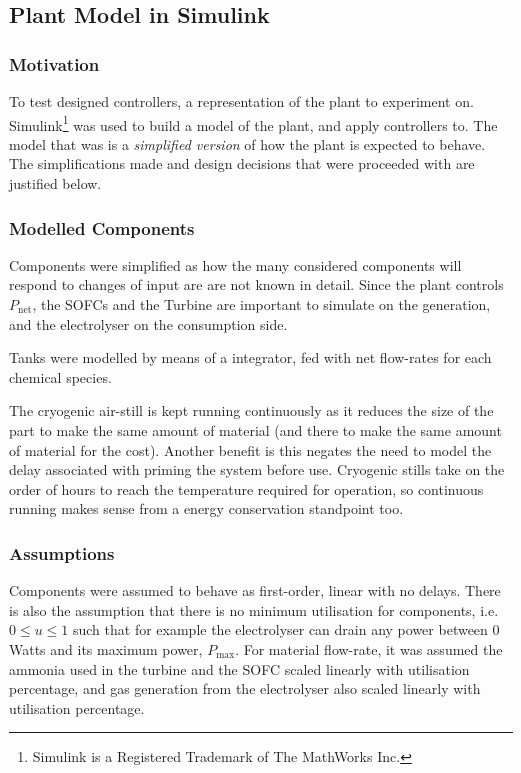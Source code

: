 \subsection{Plant Model in Simulink\textregistered}
\label{sec:plant}

\subsubsection{Motivation}
To test designed controllers, a representation of the plant to experiment on.
Simulink\footnote{Simulink is a Registered Trademark of The MathWorks Inc.} was used to build a model of the plant, and apply controllers to.
The model that was is a \emph{simplified version} of how the plant is expected to behave.
The simplifications made and design decisions that were proceeded with are justified below.

\subsubsection{Modelled Components}

Components were simplified as how the many considered components will respond to changes of input are are not known in detail.
Since the plant controls $P_{\text{net}}$, the SOFCs and the Turbine are important to simulate on the generation, and the electrolyser on the consumption side.

Tanks were modelled by means of a integrator, fed with net flow-rates for each chemical species.

The cryogenic air-still is kept running continuously as it reduces the size of the part to make the same amount of material (and there to make the same amount of material for the cost).
Another benefit is this negates the need to model the delay associated with priming the system before use.
Cryogenic stills take on the order of hours to reach the temperature required for operation, so continuous running makes sense from a energy conservation standpoint too.

\subsubsection{Assumptions}

Components were assumed to behave as first-order, linear with no delays.
There is also the assumption that there is no minimum utilisation for components, i.e. $0 \leq u \leq 1$ such that for example the electrolyser can drain any power between $0$ Watts and its maximum power, $P_{\text{max}}$.
For material flow-rate, it was assumed the ammonia used in the turbine and the SOFC scaled linearly with utilisation percentage, and gas generation from the electrolyser also scaled linearly with utilisation percentage.

